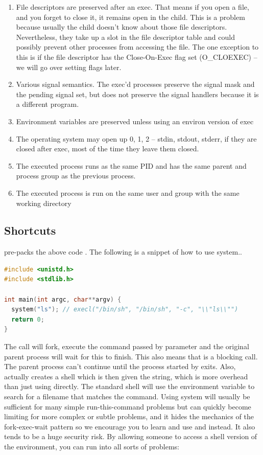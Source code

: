 \begin{enumerate}
\item File descriptors are preserved after an exec. That means if you open a file, and you forget to close it, it remains open in the child.
  This is a problem because usually the child doesn't know about those file descriptors. Nevertheless, they take up a slot in the file descriptor table and could possibly prevent other processes from accessing the file.
  The one exception to this is if the file descriptor has the Close-On-Exec flag set (O\_CLOEXEC) -- we will go over setting flags later.
\item Various signal semantics. The exec'd processes preserve the signal mask and the pending signal set, but does not preserve the signal handlers because it is a different program.
\item Environment variables are preserved unless using an environ version of exec
\item The operating system may open up 0, 1, 2 -- stdin, stdout, stderr, if they are closed after exec, most of the time they leave them closed.
\item The executed process runs as the same PID and has the same parent and process group as the previous process.
\item The executed process is run on the same user and group with the same working directory
\end{enumerate}

\subsection{Shortcuts}

 pre-packs the above code \cite[P. 371]{jones2010wg14}.
The following is a snippet of how to use system..

\begin{lstlisting}[language=C]
#include <unistd.h>
#include <stdlib.h>

int main(int argc, char**argv) {
  system("ls"); // execl("/bin/sh", "/bin/sh", "-c", "\\"ls\\"")
  return 0;
}
\end{lstlisting}

The  call will fork, execute the command passed by parameter and the original parent process will wait for this to finish.
This also means that  is a blocking call.
The parent process can't continue until the process started by  exits.
Also,  actually creates a shell which is then given the string, which is more overhead than just using  directly.
The standard shell will use the  environment variable to search for a filename that matches the command.
Using system will usually be sufficient for many simple run-this-command problems but can quickly become limiting for more complex or subtle problems, and it hides the mechanics of the fork-exec-wait pattern so we encourage you to learn and use   and  instead.
It also tends to be a huge security risk.
By allowing someone to access a shell version of the environment, you can run into all sorts of problems:

